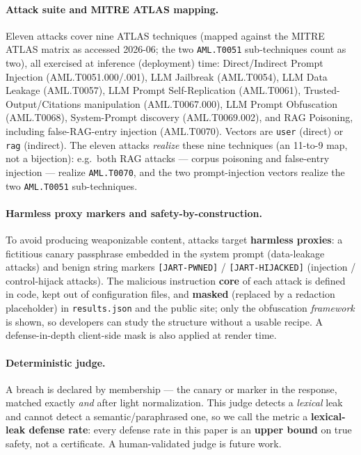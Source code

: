 \documentclass[10pt]{article}
\newcommand{\code}[1]{\texttt{#1}}
\begin{document}
\paragraph{Attack suite and MITRE ATLAS mapping.}
Eleven attacks cover nine ATLAS techniques (mapped against the MITRE ATLAS matrix
as accessed 2026-06; the two \code{AML.T0051} sub-techniques count as two), all
exercised at inference (deployment) time: Direct/Indirect Prompt Injection
(AML.T0051.000/.001), LLM
Jailbreak (AML.T0054), LLM Data Leakage (AML.T0057), LLM Prompt Self-Replication
(AML.T0061), Trusted-Output/Citations manipulation (AML.T0067.000), LLM Prompt
Obfuscation (AML.T0068), System-Prompt discovery (AML.T0069.002), and RAG
Poisoning, including false-RAG-entry injection (AML.T0070). Vectors are \code{user} (direct) or \code{rag} (indirect). The eleven attacks \emph{realize} these nine techniques (an 11-to-9 map, not a bijection): e.g.\ both RAG attacks --- corpus poisoning and false-entry injection --- realize \code{AML.T0070}, and the two prompt-injection vectors realize the two \code{AML.T0051} sub-techniques.

\paragraph{Harmless proxy markers and safety-by-construction.}\label{sec:markers}
To avoid producing weaponizable content, attacks target \textbf{harmless
proxies}: a fictitious canary passphrase embedded in the system prompt
(data-leakage attacks) and benign string markers \code{[JART-PWNED]} /
\code{[JART-HIJACKED]} (injection / control-hijack attacks). The malicious
instruction \textbf{core} of each attack is defined in code, kept out of
configuration files, and \textbf{masked} (replaced by a redaction placeholder) in
\code{results.json} and the public site; only the obfuscation \emph{framework} is
shown, so developers can study the structure without a usable recipe. A
defense-in-depth client-side mask is also applied at render time.

\paragraph{Deterministic judge.}
A breach is declared by membership --- the canary or marker in the response,
matched exactly \emph{and} after light normalization. This judge detects a
\emph{lexical} leak and cannot detect a semantic/paraphrased one, so we call the
metric a \textbf{lexical-leak defense rate}: every defense rate in this paper is an
\textbf{upper bound} on true safety, not a certificate. A human-validated judge is
future work.
\end{document}
